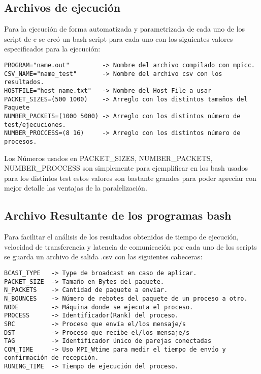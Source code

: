 \documentclass[
]{article}
\begin{document}
\hypertarget{archivos-de-ejecuciuxf3n}{%
\subsection{Archivos de ejecución}\label{archivos-de-ejecuciuxf3n}}

Para la ejecución de forma automatizada y parametrizada de cada uno de
los script de c se creó un bash script para cada uno con los siguientes
valores especificados para la ejecución:

\begin{verbatim}
PROGRAM="name.out"         -> Nombre del archivo compilado con mpicc.
CSV_NAME="name_test"       -> Nombre del archivo csv con los resultados.
HOSTFILE="host_name.txt"   -> Nombre del Host File a usar
PACKET_SIZES=(500 1000)    -> Arreglo con los distintos tamaños del Paquete
NUMBER_PACKETS=(1000 5000) -> Arreglo con los distintos número de test/ejecuciones.
NUMBER_PROCCESS=(8 16)     -> Arreglo con los distintos número de procesos.
\end{verbatim}

Los Números usados en PACKET\_SIZES, NUMBER\_PACKETS, NUMBER\_PROCCESS
son simplemente para ejemplificar en los bash usados para los distintos
test estos valores son bastante grandes para poder apreciar con mejor
detalle las ventajas de la paralelización.

\hypertarget{archivo-resultante-de-los-programas-bash}{%
\subsection{Archivo Resultante de los programas
bash}\label{archivo-resultante-de-los-programas-bash}}

Para facilitar el análisis de los resultados obtenidos de tiempo de
ejecución, velocidad de transferencia y latencia de comunicación por
cada uno de los scripts se guarda un archivo de salida .csv con las
siguientes cabeceras:

\begin{verbatim}
BCAST_TYPE   -> Type de broadcast en caso de aplicar.
PACKET_SIZE  -> Tamaño en Bytes del paquete.
N_PACKETS    -> Cantidad de paquete a enviar.
N_BOUNCES    -> Número de rebotes del paquete de un proceso a otro.
NODE         -> Máquina donde se ejecuta el proceso.
PROCESS      -> Identificador(Rank) del proceso.
SRC          -> Proceso que envía el/los mensaje/s
DST          -> Proceso que recibe el/los mensaje/s
TAG          -> Identificador único de parejas conectadas
COM_TIME     -> Uso MPI_Wtime para medir el tiempo de envío y confirmación de recepción.
RUNING_TIME  -> Tiempo de ejecución del proceso.
\end{verbatim}
\end{document}
